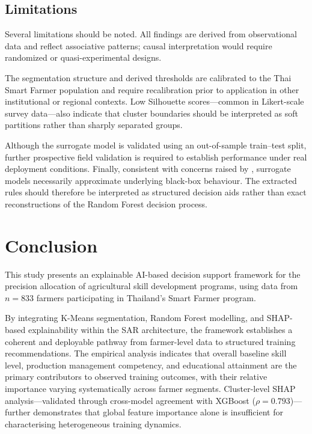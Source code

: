 \documentclass[3p,twocolumn,authoryear]{elsarticle}
\begin{document}
\subsection{Limitations}

Several limitations should be noted.
All findings are derived from observational data and reflect associative
patterns; causal interpretation would require randomized or
quasi-experimental designs.

The segmentation structure and derived thresholds are calibrated to the
Thai Smart Farmer population and require recalibration prior to
application in other institutional or regional contexts.
Low Silhouette scores—common in Likert-scale survey data—also indicate
that cluster boundaries should be interpreted as soft partitions rather
than sharply separated groups.

Although the surrogate model is validated using an out-of-sample
train--test split, further prospective field validation is required to
establish performance under real deployment conditions.
Finally, consistent with concerns raised by \citet{rudin2019}, surrogate
models necessarily approximate underlying black-box behaviour.
The extracted rules should therefore be interpreted as structured
decision aids rather than exact reconstructions of the Random Forest
decision process.


\section{Conclusion}

This study presents an explainable AI-based decision support framework for
the precision allocation of agricultural skill development programs,
using data from $n = 833$ farmers participating in Thailand’s Smart Farmer
program.

By integrating K-Means segmentation, Random Forest modelling, and
SHAP-based explainability within the SAR architecture, the framework
establishes a coherent and deployable pathway from farmer-level data to
structured training recommendations.
The empirical analysis indicates that overall baseline skill level,
production management competency, and educational attainment are the
primary contributors to observed training outcomes, with their relative
importance varying systematically across farmer segments.
Cluster-level SHAP analysis—validated through cross-model agreement with
XGBoost ($\rho = 0.793$)—further demonstrates that global feature
importance alone is insufficient for characterising heterogeneous
training dynamics.
\end{document}
